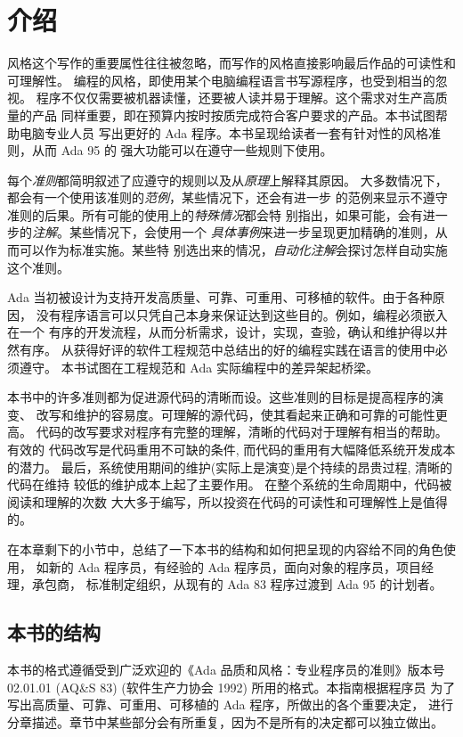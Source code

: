 \chapter{介绍}
\label{c:introduction}
\pagestyle{fancy}

风格这个写作的重要属性往往被忽略，而写作的风格直接影响最后作品的可读性和
可理解性。 编程的风格，即使用某个电脑编程语言书写源程序，也受到相当的忽视。
程序不仅仅需要被机器读懂，还要被人读并易于理解。这个需求对生产高质量的产品
同样重要，即在预算内按时按质完成符合客户要求的产品。本书试图帮助电脑专业人员
写出更好的 Ada 程序。本书呈现给读者一套有针对性的风格准则，从而 Ada 95 的
强大功能可以在遵守一些规则下使用。

每个\emph{准则}都简明叙述了应遵守的规则以及从\emph{原理}上解释其原因。
大多数情况下，都会有一个使用该准则的\emph{范例}，某些情况下，还会有进一步
的范例来显示不遵守准则的后果。所有可能的使用上的\emph{特殊情况}都会特
别指出，如果可能，会有进一步的\emph{注解}。某些情况下，会使用一个
\emph{具体事例}来进一步呈现更加精确的准则，从而可以作为标准实施。某些特
别选出来的情况，\emph{自动化注解}会探讨怎样自动实施这个准则。

Ada 当初被设计为支持开发高质量、可靠、可重用、可移植的软件。由于各种原因，
没有程序语言可以只凭自己本身来保证达到这些目的。例如，编程必须嵌入在一个
有序的开发流程，从而分析需求，设计，实现，查验，确认和维护得以井然有序。
从获得好评的软件工程规范中总结出的好的编程实践在语言的使用中必须遵守。
本书试图在工程规范和 Ada 实际编程中的差异架起桥梁。

本书中的许多准则都为促进源代码的清晰而设。这些准则的目标是提高程序的演变、
改写和维护的容易度。可理解的源代码，使其看起来正确和可靠的可能性更高。
代码的改写要求对程序有完整的理解，清晰的代码对于理解有相当的帮助。有效的
代码改写是代码重用不可缺的条件, 而代码的重用有大幅降低系统开发成本的潜力。
最后，系统使用期间的维护(实际上是演变)是个持续的昂贵过程, 清晰的代码在维持
较低的维护成本上起了主要作用。 在整个系统的生命周期中，代码被阅读和理解的次数
大大多于编写，所以投资在代码的可读性和可理解性上是值得的。

在本章剩下的小节中，总结了一下本书的结构和如何把呈现的内容给不同的角色使用，
如新的 Ada 程序员，有经验的 Ada 程序员，面向对象的程序员，项目经理，承包商，
标准制定组织，从现有的 Ada 83 程序过渡到 Ada 95 的计划者。
 
\section{本书的结构}
本书的格式遵循受到广泛欢迎的《Ada 品质和风格：专业程序员的准则》版本号
 02.01.01 (AQ\&S 83) (软件生产力协会 1992) 所用的格式。本指南根据程序员
为了写出高质量、可靠、可重用、可移植的 Ada 程序，所做出的各个重要决定，
进行分章描述。章节中某些部分会有所重复，因为不是所有的决定都可以独立做出。

